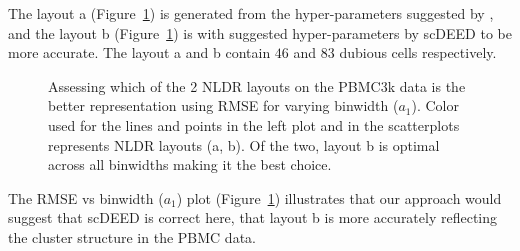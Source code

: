 \documentclass[
  12pt]{article}
\begin{document}
The layout a (Figure~\ref{fig-pbmc-mse-umap}) is generated from the
hyper-parameters suggested by \citet{chen2024}, and the layout b
(Figure~\ref{fig-pbmc-mse-umap}) is with suggested hyper-parameters by
scDEED to be more accurate. The layout a and b contain \(46\) and \(83\)
dubious cells respectively.

\begin{figure}[H]


\caption{\label{fig-pbmc-mse-umap}Assessing which of the 2 NLDR layouts
on the PBMC3k data is the better representation using RMSE for varying
binwidth (\(a_1\)). Color used for the lines and points in the left plot
and in the scatterplots represents NLDR layouts (a, b). Of the two,
layout b is optimal across all binwidths making it the best choice.}

\end{figure}%

The RMSE vs binwidth (\(a_1\)) plot (Figure~\ref{fig-pbmc-mse-umap})
illustrates that our approach would suggest that scDEED is correct here,
that layout b is more accurately reflecting the cluster structure in the
PBMC data.
\end{document}
